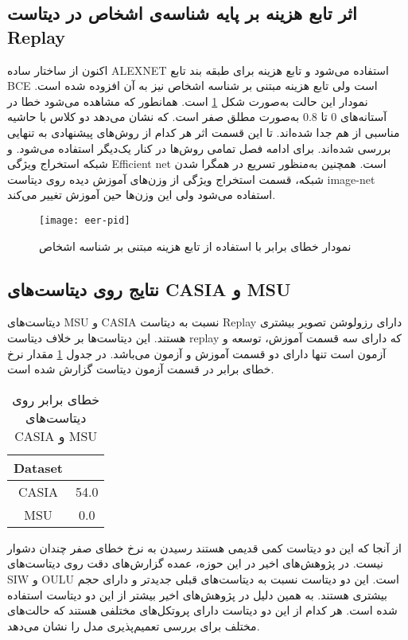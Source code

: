 \subsection{اثر تابع هزینه بر پایه شناسه‌ی اشخاص در دیتاست Replay}
اکنون از ساختار ساده ALEXNET استفاده می‌شود و تابع هزینه برای طبقه بند تابع BCE است ولی تابع هزینه مبتنی بر شناسه اشخاص نیز به آن افزوده شده است. نمودار این حالت به‌صورت شکل 
\ref{fig:eer-pid}
است. همانطور که مشاهده می‌شود خطا در آستانه‌های 0 تا 0.8 به‌صورت مطلق صفر است. که نشان می‌دهد دو کلاس با حاشیه مناسبی از هم جدا شده‌اند. تا این قسمت اثر هر کدام از روش‌های پیشنهادی به تنهایی بررسی شده‌اند. برای ادامه فصل تمامی روش‌ها در کنار یک‌دیگر استفاده می‌شود. و شبکه استخراج ویژگی Efficient net است. همچنین به‌منظور تسریع در همگرا شدن شبکه، قسمت استخراج ویژگی از وزن‌های آموزش دیده روی دیتاست image-net استفاده می‌شود ولی این وزن‌ها حین آموزش تغییر می‌کند.
\begin{figure}[h]
	\centerline{\texttt{[image: eer-pid]}}
	\caption{نمودار خطای برابر با استفاده از تابع هزینه مبتنی بر شناسه اشخاص}
	\label{fig:eer-pid}
\end{figure}

\subsection{نتایج روی دیتاست‌های CASIA و MSU}
دیتاست‌های MSU و CASIA نسبت به دیتاست Replay دارای رزولوشن تصویر بیشتری هستند. این دیتاست‌ها بر خلاف دیتاست replay که دارای سه قسمت آموزش، توسعه و آزمون است تنها دارای دو قسمت آموزش و آزمون می‌باشد. در جدول
\ref{tab:eercasiamsu}
 مقدار نرخ خطای برابر در قسمت آزمون دیتاست گزارش شده است.
\begin{table}[ht]
	\caption{خطای برابر روی دیتاست‌های CASI‌A و ‌MSU}
	\label{tab:eercasiamsu}
	\centering
	\onehalfspacing
	\begin{tabular}{|c|c|}
		\hline Dataset &\lr{ EER (\%)}   \\
		\hline CASIA   & 54.0     \\
		\hline MSU     & 0.0 \\
		   \hline
	\end{tabular} 
\end{table}

از آنجا که این دو دیتاست کمی قدیمی هستند رسیدن به نرخ خطای صفر چندان دشوار نیست. در پژوهش‌های اخیر در این حوزه، عمده گزارش‌های دقت روی دیتاست‌های SIW و OULU است. این دو دیتاست نسبت به دیتاست‌های قبلی جدیدتر و دارای حجم بیشتری هستند. به همین دلیل در پژوهش‌های اخیر بیشتر از این دو دیتاست استفاده شده است. هر کدام از این دو دیتاست دارای پروتکل‌های مختلفی هستند که حالت‌های مختلف برای بررسی تعمیم‌پذیری مدل را نشان می‌دهد.
